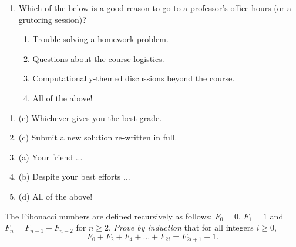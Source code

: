 \documentclass[12 pt, letterpaper]{hmcpset}
\begin{document}
\begin{problem}
\begin{enumerate}[label = \arabic*.]
\begin{enumerate}
				\item Despite your best efforts, the in-class explanation of the Ford--Fulkerson algorithm doesn't make sense to you. To prepare for the midterm, you ask an LLM to walk you through an example.
				\item After writing up your answer to a HW problem, you're not sure if you've gotten your point across. Using the prompt ``Can you reword this proof to make it easier to read?'', you use an LLM to improve your grammar.
			\end{enumerate}

		\item Which of the below is a good reason to go to a professor's office hours (or a grutoring session)?
			\begin{enumerate}
				\item Trouble solving a homework problem.
				\item Questions about the course logistics.
				\item Computationally-themed discussions beyond the course.
				\item All of the above!
			\end{enumerate}
	\end{enumerate}
\end{problem}

\begin{solution}
	\begin{enumerate}[label = \arabic*.]
		\item (c) Whichever gives you the best grade.
		\item (c) Submit a new solution re-written in full.
		\item (a) Your friend ...
		\item (b) Despite your best efforts ...
		\item (d) All of the above!
	\end{enumerate}
\end{solution}

\pagebreak

\begin{problem}
	The Fibonacci numbers are defined recursively as follows: $F_{0} = 0$, $F_{1} = 1$ and $F_{n} = F_{n - 1} + F_{n - 2}$ for $n \ge 2$. \emph{Prove by induction} that for all integers $i \ge 0$,
	\[
		F_{0} + F_{2} + F_{4} + \dots + F_{2i} = F_{2i + 1} - 1.
	\]
\end{problem}
\end{document}
